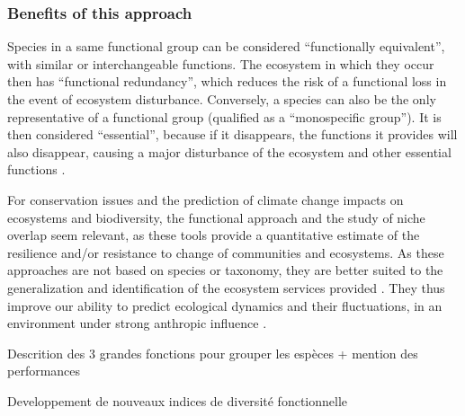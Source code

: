 \subsubsection{Benefits of this approach}

Species in a same functional group can be considered ``functionally equivalent'', with similar or interchangeable functions. The ecosystem in which they occur then has ``functional redundancy'', which reduces the risk of a functional loss in the event of ecosystem disturbance. Conversely, a species can also be the only representative of a functional group (qualified as a ``monospecific group''). It is then considered ``essential'', because if it disappears, the functions it provides will also disappear, causing a major disturbance of the ecosystem and other essential functions \citep{mejri2009}. 

For conservation issues and the prediction of climate change impacts on ecosystems and biodiversity, the functional approach and the study of niche overlap seem relevant, as these tools provide a quantitative estimate of the resilience and/or resistance to change of communities and ecosystems. As these approaches are not based on species or taxonomy, they are better suited to the generalization and identification of the ecosystem services provided \citep{martini2020,mcgill2006}. They thus improve our ability to predict ecological dynamics and their fluctuations, in an environment under strong anthropic influence \citep{kremer2017}.


Descrition des 3 grandes fonctions pour grouper les espèces + mention des performances 

Developpement de nouveaux indices de diversité fonctionnelle 
